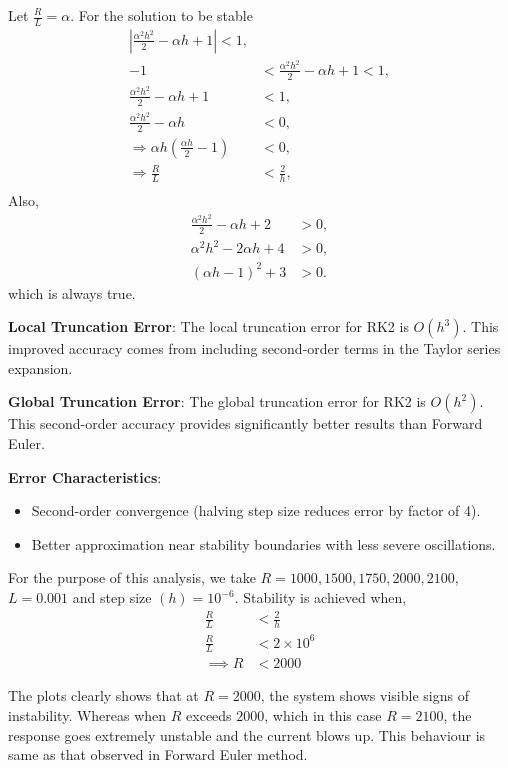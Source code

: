 \documentclass[12pt]{article}
\newcommand{\brak}[1]{\ensuremath{\left(#1\right)}}
\begin{document}
Let $\frac{R}{L} = \alpha$. For the solution to be stable
\begin{align*}
\left| \frac{\alpha^2 h^2}{2} - \alpha h + 1 \right| < 1, \\
        -1 &< \frac{\alpha^2 h^2}{2} - \alpha h + 1 < 1, \\
        \frac{\alpha^2 h^2}{2} - \alpha h + 1 &< 1, \\
        \frac{\alpha^2 h^2}{2} - \alpha h &< 0, \\
        \Rightarrow \alpha h \left( \frac{\alpha h}{2} - 1 \right) &< 0, \\
        \Rightarrow \frac{R}{L} &< \frac{2}{h}, \\
\end{align*}
Also,
\begin{align*}
        \frac{\alpha^2 h^2}{2} - \alpha h + 2 &> 0, \\
        \alpha^2 h^2 - 2\alpha h + 4 &> 0, \\
        (\alpha h - 1)^2 + 3 &> 0.
\end{align*}
which is always true.

\textbf{Local Truncation Error}: The local truncation error for RK2 is $O(h^3)$. This improved accuracy comes from including second-order terms in the Taylor series expansion.

\textbf{Global Truncation Error}: The global truncation error for RK2 is $O(h^2)$. This second-order accuracy provides significantly better results than Forward Euler.

\textbf{Error Characteristics}:
\begin{itemize}
\item Second-order convergence (halving step size reduces error by factor of 4).
\item Better approximation near stability boundaries with less severe oscillations.
\end{itemize}

For the purpose of this analysis, we take $R = 1000, 1500, 1750, 2000, 2100$, $L = 0.001$ and step size $\brak{h} = 10^{-6}$.\newline
Stability is achieved when,
\begin{align*}
\frac{R}{L} &< \frac{2}{h}\\
\frac{R}{L} &< 2\times10^6\\
\implies R &< 2000
\end{align*}

The plots clearly shows that at $R = 2000$, the system shows visible signs of instability. Whereas when $R$ exceeds $2000$, which in this case $R = 2100$, the response goes extremely unstable and the current blows up. This behaviour is same as that observed in Forward Euler method.
\end{document}
